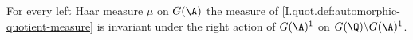 For every left Haar measure $\mu$ on $G(\A)$ the measure of \cref{I.quot.def:automorphic-quotient-measure} is invariant under the right action of $G(\A)^1$ on $G(\Q)\backslash G(\A)^1$.
